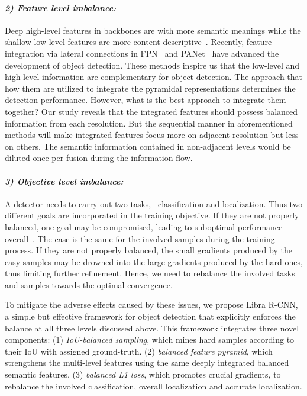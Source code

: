 \documentclass[10pt,twocolumn,letterpaper]{article}
\begin{document}
\paragraph{\emph{2) Feature level imbalance:}}
Deep high-level features in backbones are with more semantic meanings while the shallow low-level features are more content descriptive~\cite{zeiler2014visualizing}.
Recently, feature integration via lateral connections in FPN~\cite{fpn} and PANet~\cite{panet} have advanced the development of object detection.
These methods inspire us that the low-level and high-level information are complementary for object detection.
The approach that how them are utilized to integrate the pyramidal representations determines the detection performance.
However, what is the best approach to integrate them together?
Our study reveals that the integrated features should possess balanced information from each resolution.
But the sequential manner in aforementioned methods will make
integrated features focus more on adjacent resolution but less on others.
The semantic information contained in non-adjacent levels would be diluted once per fusion during the information flow.

\vspace{-15pt}
\paragraph{\emph{3) Objective level imbalance:}}
A detector needs to carry out two tasks, \ie~classification and localization.
Thus two different goals are incorporated in the training objective.
If they are not properly balanced, one goal may be compromised, leading to suboptimal performance overall~\cite{kendall2017multi}.
The case is the same for the involved samples during the training process.
If they are not properly balanced, the small gradients produced by the easy samples may be drowned into the large gradients produced by the hard ones, thus limiting further refinement.
Hence, we need to rebalance the involved tasks and samples towards the optimal convergence.



To mitigate the adverse effects caused by these issues,
we propose Libra R-CNN, a simple but effective framework for object detection that
explicitly enforces the balance at all three levels discussed above.
This framework integrates three novel components:
(1) \emph{IoU-balanced sampling}, which mines hard samples according to their IoU with assigned ground-truth.
(2) \emph{balanced feature pyramid},
which strengthens the multi-level features using the same deeply integrated balanced semantic features.
(3) \emph{balanced L1 loss}, which promotes crucial gradients, to rebalance the involved classification, overall localization and accurate localization.
\end{document}
